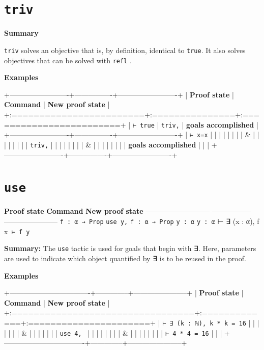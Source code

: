 \documentclass{memoir}
\begin{document}
\section{\Verb|triv|}

\textbf{Summary}

\Verb|triv| solves an objective that is, by definition, identical to \Verb|true|. It also solves objectives that can be solved with \Verb|refl|
.

\textbf{Examples}

+-------------------------+----------------+-------------------------+
| \textbf{Proof state} | \textbf{Command} | \textbf{New proof state} |
+:========================+:===============+:========================+
| \Verb|⊢ true| | \Verb|triv,| | \textbf{goals accomplished} |
+-------------------------+----------------+-------------------------+
| \Verb|⊢ x=x| | | |
| | | |
| & | | |
| | | |
| \Verb|triv,| | | |
| | | |
| & | | |
| | | |
| \textbf{goals accomplished} | | |
+-------------------------+----------------+-------------------------+




\section{\Verb|use|}

\textbf{Proof state} \textbf{Command} \textbf{New proof state}
--------------------------- ----------------- -----------------------
\Verb|f : α → Prop| \Verb|use y,| \Verb|f : α → Prop|
\Verb|y : α| \Verb|y : α|
⊢ ∃ (x : α), f x\Verb| ⊢ f y|

\textbf{Summary:} The \Verb|use| tactic is used for goals that begin with ∃. Here, parameters are used to indicate which object quantified by ∃ is to be reused in the proof.

\textbf{Examples}

+----------------------------------+--------------+-----------------------+
| \textbf{Proof state} | \textbf{Command} | \textbf{New proof state} |
+:=================================+:=============+:======================+
| \Verb|⊢ ∃ (k : ℕ), k * k = 16| | | |
| | |
| & | | |
| | |
| \Verb|use 4, | | | |
| | | |
| & | | |
| | | |
| \Verb|⊢ 4 * 4 = 16| | | |
+----------------------------------+--------------+-----------------------+
\end{document}
